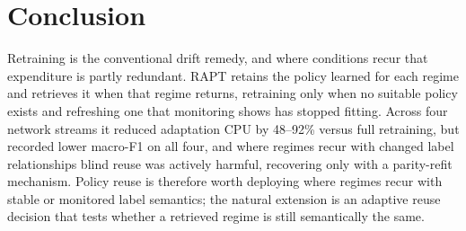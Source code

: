 \documentclass[conference]{IEEEtran}
\begin{document}
\section{Conclusion}

Retraining is the conventional drift remedy, and where conditions recur that
expenditure is partly redundant. RAPT retains the policy learned for each regime and
retrieves it when that regime returns, retraining only when no suitable policy exists
and refreshing one that monitoring shows has stopped fitting. Across four network
streams it reduced adaptation CPU by 48--92\% versus full retraining, but recorded
lower macro-F1 on all four, and where regimes recur with changed label relationships
blind reuse was actively harmful, recovering only with a parity-refit mechanism.
Policy reuse is therefore worth deploying where regimes recur with stable or monitored
label semantics; the natural extension is an adaptive reuse decision that tests
whether a retrieved regime is still semantically the same.
\end{document}
